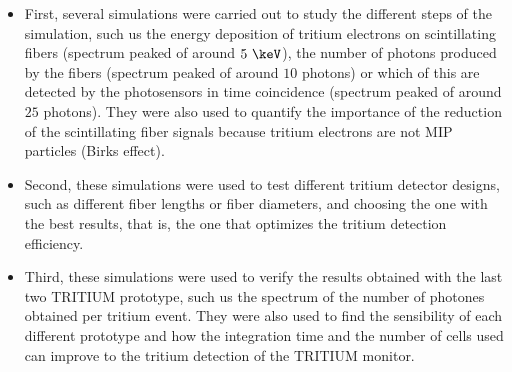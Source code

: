 \begin{itemize}

\item{} First, several simulations were carried out to study the different steps of the simulation, such us the energy deposition of tritium electrons on scintillating fibers (spectrum peaked of around $5~\keV$), the number of photons produced by the fibers (spectrum peaked of around $10$ photons) or which of this are detected by the photosensors in time coincidence (spectrum peaked of around $25$ photons). They were also used to quantify the importance of the reduction of the scintillating fiber signals because tritium electrons are not MIP particles (Birks effect).

\item{} Second, these simulations were used to test different tritium detector designs, such as different fiber lengths or fiber diameters, and choosing the one with the best results, that is, the one that optimizes the tritium detection efficiency.

\item{} Third, these simulations were used to verify the results obtained with the last two TRITIUM prototype, such us the spectrum of the number of photones obtained per tritium event. They were also used to find the sensibility of each different prototype and how the integration time and the number of cells used can improve to the tritium detection of the TRITIUM monitor.

\end{itemize}


